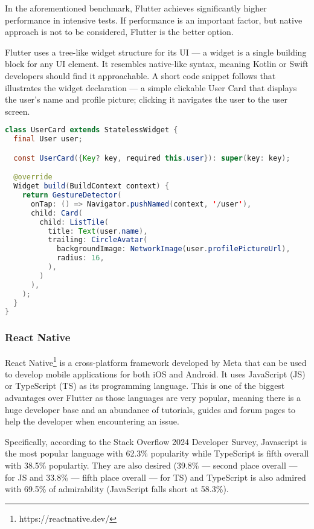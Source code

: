 \documentclass[
  digital,     %
  color,       %
  oneside,     %
  nosansbold,  %
  nocolorbold, %
  lof,         %
  lot,         %
]{fithesis4}
\begin{document}
In the aforementioned benchmark, Flutter achieves significantly higher performance in intensive tests. If performance is an important factor, but native approach is not to be considered, Flutter is the better option.

Flutter uses a tree-like widget structure for its UI --- a widget is a single building block for any UI element. It resembles native-like syntax, meaning Kotlin or Swift developers should find it approachable. A short code snippet follows that illustrates the widget declaration --- a simple clickable User Card that displays the user's name and profile picture; clicking it navigates the user to the user screen.

\begin{lstlisting}[language=java, caption={Flutter example --- User Card}]
class UserCard extends StatelessWidget {
  final User user;

  const UserCard({Key? key, required this.user}): super(key: key);

  @override
  Widget build(BuildContext context) {
    return GestureDetector(
      onTap: () => Navigator.pushNamed(context, '/user'),
      child: Card(
        child: ListTile(
          title: Text(user.name),
          trailing: CircleAvatar(
            backgroundImage: NetworkImage(user.profilePictureUrl),
            radius: 16,
          ),
        )
      ),
    );
  }
}  
\end{lstlisting}

\subsubsection{React Native}
React Native\footnote{https://reactnative.dev/} is a cross-platform framework developed by Meta that can be used to develop mobile applications for both iOS and Android. It uses JavaScript (JS) or TypeScript (TS) as its programming language. This is one of the biggest advantages over Flutter as those languages are very popular, meaning there is a huge developer base and an abundance of tutorials, guides and forum pages to help the developer when encountering an issue. 

Specifically, according to the Stack Overflow 2024 Developer Survey\cite{StackOverflow2024}, Javascript is the most popular language with 62.3\% popularity while TypeScript is fifth overall with 38.5\% populartiy. They are also desired (39.8\% --- second place overall --- for JS and 33.8\% --- fifth place overall --- for TS) and TypeScript is also admired with 69.5\% of admirability (JavaScript falls short at 58.3\%).
\end{document}
